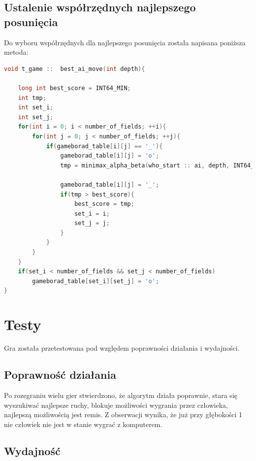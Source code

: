 \documentclass[12pt]{article}
\begin{document}
    \subsection{Ustalenie współrzędnych najlepszego posunięcia}
    Do wyboru współrzędnych dla najlepszego posunięcia została napisana poniższa metoda:
    \begin{lstlisting}[language=C++, caption=best\_ai\_move()]
    void t_game ::  best_ai_move(int depth){

    long int best_score = INT64_MIN;
    int tmp;
    int set_i;
    int set_j;
    for(int i = 0; i < number_of_fields; ++i){
        for(int j = 0; j < number_of_fields; ++j){
            if(gameborad_table[i][j] == '_'){
                gameborad_table[i][j] = 'o';
                tmp = minimax_alpha_beta(who_start :: ai, depth, INT64_MIN, INT64_MAX);

                gameborad_table[i][j] = '_';
                if(tmp > best_score){
                    best_score = tmp;
                    set_i = i;
                    set_j = j;
                }
            }
        }
    }
    if(set_i < number_of_fields && set_j < number_of_fields)
        gameborad_table[set_i][set_j] = 'o';
}

\end{lstlisting}
\section{Testy}
    Gra została przetestowana pod względem poprawności działania i wydajności. 
        \subsection{Poprawność działania}
            Po rozegraniu wielu gier stwierdzono, że algorytm działa poprawnie, stara się wyszukiwać najlepsze ruchy,
            blokuje możliwości wygrania przez człowieka, najlepszą możliwością jest remis.
            Z obserwacji wynika, że już przy głębokości 1 nie człowiek nie jest w stanie wygrać z komputerem.
        \subsection{Wydajność}
\end{document}
